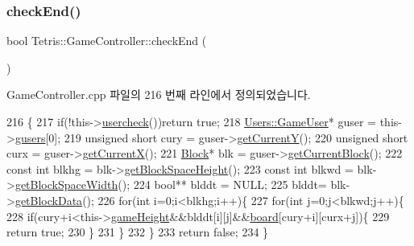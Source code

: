 \subsubsection{\texorpdfstring{check\+End()}{checkEnd()}\hspace{0.1cm}{\footnotesize\ttfamily [1/2]}}
{\footnotesize\ttfamily bool Tetris\+::\+Game\+Controller\+::check\+End (\begin{DoxyParamCaption}{ }\end{DoxyParamCaption})}



Game\+Controller.\+cpp 파일의 216 번째 라인에서 정의되었습니다.


\begin{DoxyCode}
216                                  \{
217                 \textcolor{keywordflow}{if}(!this->\hyperlink{class_tetris_1_1_game_controller_ab96e22daad51119b35cbee8cfb7385ef}{usercheck}())\textcolor{keywordflow}{return} \textcolor{keyword}{true};
218                 \hyperlink{class_tetris_1_1_users_1_1_game_user}{Users::GameUser}* guser = this->\hyperlink{class_tetris_1_1_game_controller_a1a31d3a933daad6d95e20458eea2900e}{gusers}[0];
219                 \textcolor{keywordtype}{unsigned} \textcolor{keywordtype}{short} cury = guser->\hyperlink{class_tetris_1_1_users_1_1_game_user_af5bd7ff0b575af1b42b093488cff97e2}{getCurrentY}();
220                 \textcolor{keywordtype}{unsigned} \textcolor{keywordtype}{short} curx = guser->\hyperlink{class_tetris_1_1_users_1_1_game_user_ad25eace96bd27ae6df4a0c0d506be730}{getCurrentX}();
221                 \hyperlink{class_tetris_1_1_block}{Block}* blk = guser->\hyperlink{class_tetris_1_1_users_1_1_game_user_a3d4bcc74d518c28356012f8a42b85896}{getCurrentBlock}();
222                 \textcolor{keyword}{const} \textcolor{keywordtype}{int} blkhg = blk->\hyperlink{class_tetris_1_1_block_a5301977e32c03aaf122fa289fcba77ba}{getBlockSpaceHeight}();
223                 \textcolor{keyword}{const} \textcolor{keywordtype}{int} blkwd = blk->\hyperlink{class_tetris_1_1_block_ac390e14de476582300d815d9054ed9bd}{getBlockSpaceWidth}();
224                 \textcolor{keywordtype}{bool}** blddt = NULL;
225                 blddt= blk->\hyperlink{class_tetris_1_1_block_a9bd2c3d6ccacff9a5f56f72336ba324f}{getBlockData}();
226                 \textcolor{keywordflow}{for}(\textcolor{keywordtype}{int} i=0;i<blkhg;i++)\{
227                     \textcolor{keywordflow}{for}(\textcolor{keywordtype}{int} j=0;j<blkwd;j++)\{
228                         \textcolor{keywordflow}{if}(cury+i<this->\hyperlink{class_tetris_1_1_game_controller_a8e3adc647ed382de0ff541417bea9b33}{gameHeight}&&blddt[i][j]&&\hyperlink{class_tetris_1_1_game_controller_a7725b6cec9459a6bffaa3e29dd1c5196}{board}[cury+i][curx+j])\{
229                             \textcolor{keywordflow}{return} \textcolor{keyword}{true};
230                         \}
231                     \}
232                 \}
233                 \textcolor{keywordflow}{return} \textcolor{keyword}{false};
234             \}
\end{DoxyCode}
